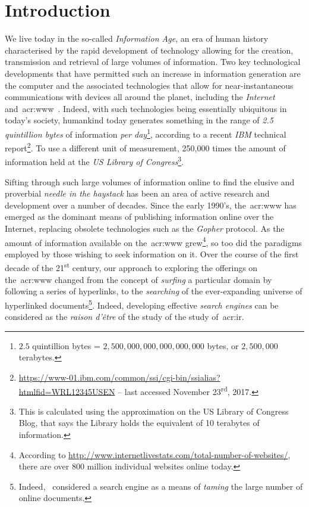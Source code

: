 
\chapter{Introduction}\label{chap:intro}
We live today in the so-called \emph{Information Age}, an era of human history characterised by the rapid development of technology allowing for the creation, transmission and retrieval of large volumes of information. Two key technological developments that have permitted such an increase in information generation are the computer and the associated technologies that allow for near-instantaneous communications with devices all around the planet, including the \emph{Internet} and~\gls{acr:www}~\citep{berners1994www}. Indeed, with such technologies being  essentially ubiquitous in today's society, humankind today generates something in the range of \emph{2.5 quintillion bytes} of information \emph{per day}\footnote{$2.5$ quintillion bytes = $2,500,000,000,000,000,000$ bytes, or $2,500,000$ terabytes.}, according to a recent \emph{IBM} technical report\footnote{\url{https://www-01.ibm.com/common/ssi/cgi-bin/ssialias?htmlfid=WRL12345USEN} -- last accessed November 23\textsuperscript{rd}, 2017.}. To use a different unit of measurement, 250,000 times the amount of information held at the \emph{US Library of Congress}\footnote{This is calculated using the approximation on the US Library of Congress Blog, that says the Library holds the equivalent of 10 terabytes of information.}.

Sifting through such large volumes of information online to find the elusive and proverbial \emph{needle in the haystack} has been an area of active research and development over a number of decades. Since the early 1990's, the~\gls{acr:www} has emerged as the dominant means of publishing information online over the Internet, replacing obsolete technologies such as the \emph{Gopher} protocol. As the amount of information available on the~\gls{acr:www} grew\footnote{According to \url{http://www.internetlivestats.com/total-number-of-websites/}, there are over 800 million individual websites online today.}, so too did the paradigms employed by those wishing to seek information on it. Over the course of the first decade of the 21\textsuperscript{st} century, our approach to exploring the offerings on the~\gls{acr:www} changed from the concept of \emph{surfing} a particular domain by following a series of hyperlinks, to the \emph{searching} of the ever-expanding universe of hyperlinked documents\footnote{Indeed,~\citep{mcbryan1994taming_tools} considered a search engine as a means of \emph{taming} the large number of online documents.}. Indeed, developing effective \emph{search engines} can be considered as the \emph{raison d'\^{e}tre} of the study of the study of~\gls{acr:ir}.

